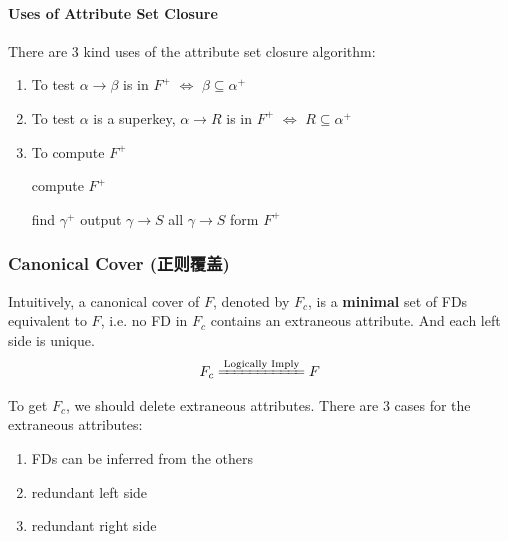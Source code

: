\paragraph{Uses of Attribute Set Closure}
There are 3 kind uses of the attribute set closure algorithm:
\begin{enumerate}
    \item To test $\alpha \rightarrow \beta$ is in $F^+$ $\Leftrightarrow$ $\beta \subseteq \alpha^+$
    \item To test $\alpha$ is a superkey, $\alpha \rightarrow R$ is in $F^+$ $\Leftrightarrow$ $R\subseteq \alpha^+$
    \item To compute $F^+$
    \begin{algorithm}[H]
        \caption{compute $F^+$}
        \begin{algorithmic}
                \State find $\gamma^+$
                    \State output $\gamma \rightarrow S$
                \EndFor
            \EndFor
            \State all $\gamma \rightarrow S$ form $F^+$
        \end{algorithmic}
    \end{algorithm}
    
\end{enumerate}

\subsubsection{Canonical Cover (正则覆盖)}
\begin{definition}
    Intuitively, a canonical cover of $F$, denoted by $F_c$, is a \textbf{minimal} set of FDs equivalent to $F$, i.e. no FD in $F_c$ contains an extraneous attribute. And each left side  is unique. 
    \begin{align*}
        F_c \xlongequal{\text{Logically Imply}} F
    \end{align*}
\end{definition}

To get $F_c$, we should delete extraneous attributes. There are 3 cases for the extraneous attributes:
\begin{enumerate}\small
    \item FDs can be inferred from the others
    \item redundant left side 
    \item redundant right side
\end{enumerate}

